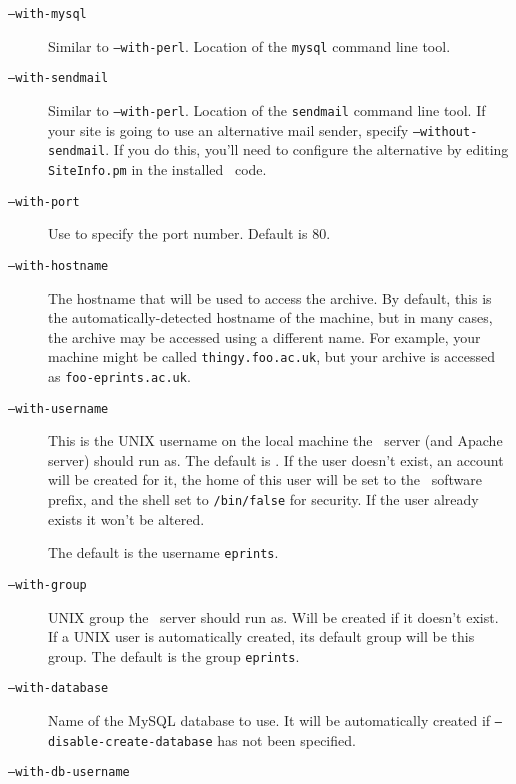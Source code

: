 \begin{description}
\item[{\tt --with-mysql}]

Similar to {\tt --with-perl}. Location of the {\tt mysql} command line tool.

\item[{\tt --with-sendmail}]

Similar to {\tt --with-perl}. Location of the {\tt sendmail} command line tool. If your site is going to use an alternative mail sender, specify {\tt --without-sendmail}. If you do this, you'll need to configure the alternative by editing {\tt SiteInfo.pm} in the installed \eprints\ code.

\item[{\tt --with-port}]

Use to specify the port number. Default is 80.

\item[{\tt --with-hostname}]

The hostname that will be used to access the archive. By default, this is the automatically-detected hostname of the machine, but in many cases, the archive may be accessed using a different name. For example, your machine might be called {\tt thingy.foo.ac.uk}, but your archive is accessed as {\tt foo-eprints.ac.uk}.

\item[{\tt --with-username}]

This is the UNIX username on the local machine the \eprints\ server (and Apache server) should run as. The default is \eprints. If the user doesn't exist, an account will be created for it, the home of this user will be set to the \eprints\ software prefix, and the shell set to {\tt /bin/false} for security. If the user already exists it won't be altered.

The default is the username {\tt eprints}.

\item[{\tt --with-group}]

UNIX group the \eprints\ server should run as. Will be created if it doesn't exist. If a UNIX user is automatically created, its default group will be this group. The default is the group {\tt eprints}.

\item[{\tt --with-database}]

Name of the MySQL database to use. It will be automatically created if {\tt --disable-create-database} has not been specified.

\item[{\tt --with-db-username}]


\end{description}
